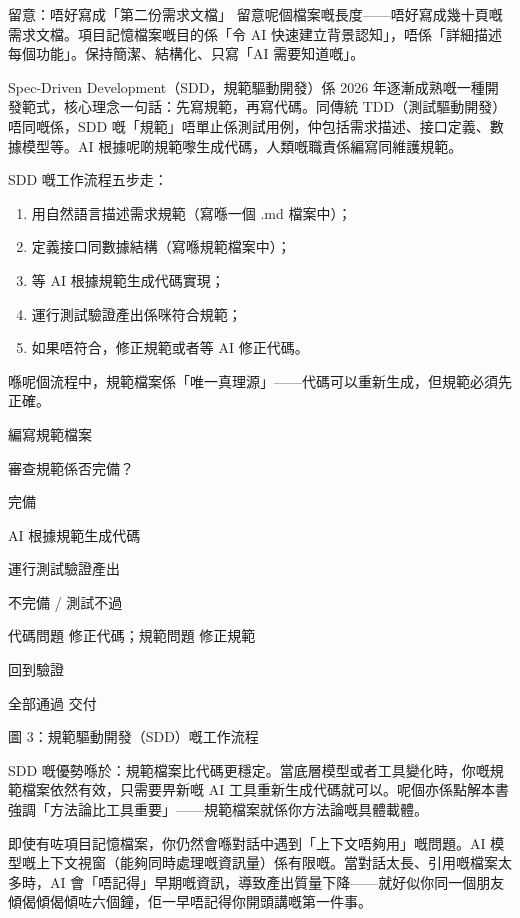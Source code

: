 \begin{tcbwarn}{留意：唔好寫成「第二份需求文檔」}
留意呢個檔案嘅長度——唔好寫成幾十頁嘅需求文檔。項目記憶檔案嘅目的係「令 AI 快速建立背景認知」，唔係「詳細描述每個功能」。保持簡潔、結構化、只寫「AI 需要知道嘅」。

\end{tcbwarn}


Spec-Driven Development（SDD，規範驅動開發）係 2026 年逐漸成熟嘅一種開發範式，核心理念一句話：先寫規範，再寫代碼。同傳統 TDD（測試驅動開發）唔同嘅係，SDD 嘅「規範」唔單止係測試用例，仲包括需求描述、接口定義、數據模型等。AI 根據呢啲規範嚟生成代碼，人類嘅職責係編寫同維護規範。

SDD 嘅工作流程五步走：

\begin{enumerate}
  \item 用自然語言描述需求規範（寫喺一個 .md 檔案中）；
  \item 定義接口同數據結構（寫喺規範檔案中）；
  \item 等 AI 根據規範生成代碼實現；
  \item 運行測試驗證產出係咪符合規範；
  \item 如果唔符合，修正規範或者等 AI 修正代碼。
\end{enumerate}

喺呢個流程中，規範檔案係「唯一真理源」——代碼可以重新生成，但規範必須先正確。

編寫規範檔案

審查規範係否完備？

完備

AI 根據規範生成代碼

運行測試驗證產出

不完備 / 測試不過

代碼問題 修正代碼；規範問題 修正規範

回到驗證

全部通過 交付

\begin{center}\small\color{gray}圖 3：規範驅動開發（SDD）嘅工作流程\end{center}

SDD 嘅優勢喺於：規範檔案比代碼更穩定。當底層模型或者工具變化時，你嘅規範檔案依然有效，只需要畀新嘅 AI 工具重新生成代碼就可以。呢個亦係點解本書強調「方法論比工具重要」——規範檔案就係你方法論嘅具體載體。


即使有咗項目記憶檔案，你仍然會喺對話中遇到「上下文唔夠用」嘅問題。AI 模型嘅上下文視窗（能夠同時處理嘅資訊量）係有限嘅。當對話太長、引用嘅檔案太多時，AI 會「唔記得」早期嘅資訊，導致產出質量下降——就好似你同一個朋友傾偈傾偈傾咗六個鐘，佢一早唔記得你開頭講嘅第一件事。

